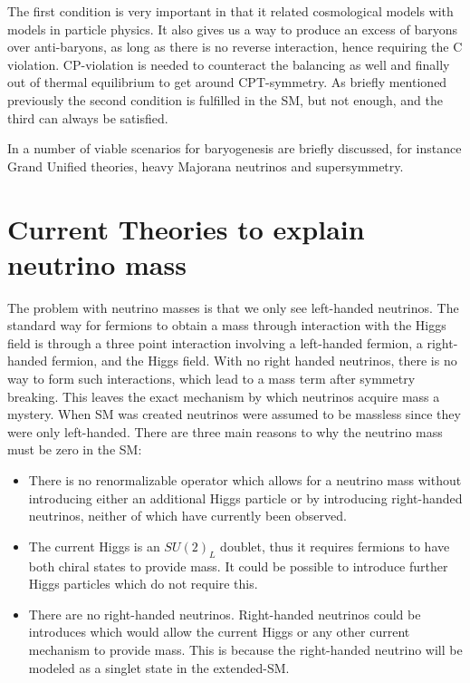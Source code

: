 The first condition is very important in that it related cosmological models with models in particle physics. It also gives us a way to produce an excess of baryons over anti-baryons, as long as there is no reverse interaction, hence requiring the C violation. CP-violation is needed to counteract the balancing as well and finally out of thermal equilibrium to get around CPT-symmetry. As briefly mentioned previously the second condition is fulfilled in the SM, but not enough, and the third can always be satisfied.

In \cite{36CRC} a number of viable scenarios for baryogenesis are briefly discussed, for instance Grand Unified theories, heavy Majorana neutrinos and supersymmetry.

\pagebreak
\section{Current Theories to explain neutrino mass}
The problem with neutrino masses is that we only see left-handed neutrinos. The standard way for fermions to obtain a mass through interaction with the Higgs field is through a three point interaction involving a left-handed fermion, a right-handed fermion, and the Higgs field. With no right handed neutrinos, there is no way to form such interactions, which lead to a mass term after symmetry breaking. This leaves the exact mechanism by which neutrinos acquire mass a mystery. When SM was created neutrinos were assumed to be massless since they were only left-handed. There are three main reasons to why the neutrino mass must be zero in the SM:
\begin{itemize}
\item There is no renormalizable operator which allows for a neutrino mass without introducing either an additional Higgs particle or by introducing right-handed neutrinos, neither of which have currently been observed.

\item The current Higgs is an $SU(2)_L$ doublet, thus it requires fermions to have both chiral states to provide mass. It could be possible to introduce further Higgs particles which do not require this.

\item There are no right-handed neutrinos. Right-handed neutrinos could be introduces which would allow the current Higgs or any other current mechanism to provide mass. This is because the right-handed neutrino will be modeled as a singlet state in the extended-SM.
\end{itemize}

